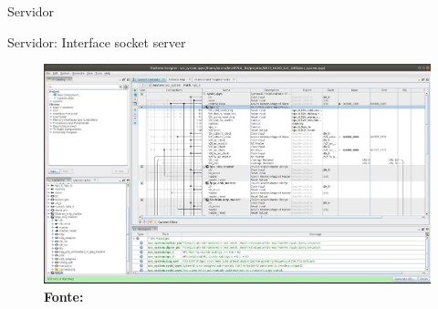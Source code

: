 \documentclass[10pt]{beamer}
\begin{document}
\begin{frame}{Servidor}
    \begin{alertblock}{Servidor: Interface socket server}
		\vspace{0.2cm}
		\begin{figure}[h]
			\begin{center}
				\includegraphics[scale=0.24]{imagens/Platiform.png}\\
				{\footnotesize \textbf{Fonte:}}
			\end{center}
			\label{fig:platform}
		\end{figure}
	\end{alertblock}
\end{frame}



\end{document}
